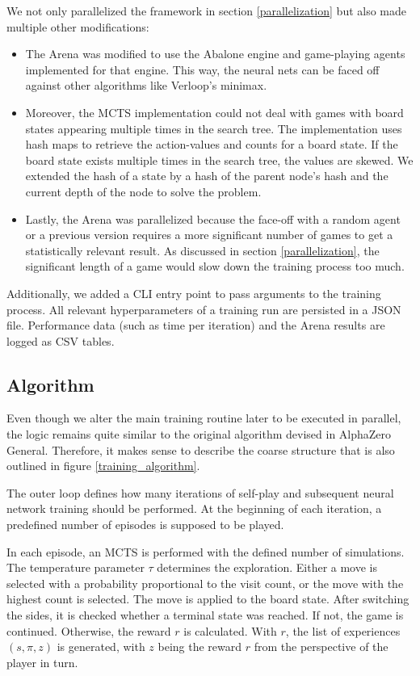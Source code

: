 We not only parallelized the framework  in section \ref{parallelization} but also made multiple other modifications:
\begin{itemize}
    \item The Arena was modified to use the Abalone engine \cite{claussen_abalone_2021} and game-playing agents implemented for that engine. This way, the neural nets can be faced off against other algorithms like Verloop's minimax.
    \item Moreover, the MCTS implementation could not deal with games with board states appearing multiple times in the search tree. The implementation uses hash maps to retrieve the action-values and counts for a board state. If the board state exists multiple times in the search tree, the values are skewed. We extended the hash of a state by a hash of the parent node's hash and the current depth of the node to solve the problem.
    \item Lastly, the Arena was parallelized because the face-off with a random agent or a previous version requires a more significant number of games to get a statistically relevant result. As discussed in section \ref{parallelization}, the significant length of a game would slow down the training process too much.
\end{itemize}

Additionally, we added a CLI entry point to pass arguments to the training process. All relevant hyperparameters of a training run are persisted in a JSON file. Performance data (such as time per iteration) and the Arena results are logged as CSV tables.

\subsection{Algorithm}
Even though we alter the main training routine later to be executed in parallel, the logic remains quite similar to the original algorithm devised in AlphaZero General. Therefore, it makes sense to describe the coarse structure that is also outlined in figure \ref{training_algorithm}.

The outer loop defines how many iterations of self-play and subsequent neural network training should be performed. At the beginning of each iteration, a predefined number of episodes is supposed to be played.

In each episode, an MCTS is performed with the defined number of simulations. The temperature parameter $\tau$ determines the exploration. Either a move is selected with a probability proportional to the visit count, or the move with the highest count is selected. The move is applied to the board state. After switching the sides, it is checked whether a terminal state was reached. If not, the game is continued. Otherwise, the reward $r$ is calculated. With $r$, the list of experiences $(s, \pi, z)$ is generated, with $z$ being the reward $r$ from the perspective of the player in turn.

